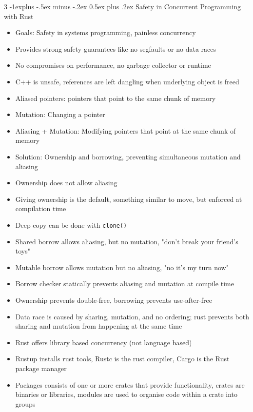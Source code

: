 \documentclass[10pt, landscape]{article}
\makeatletter
\renewcommand{\section}{\@startsection{section}{1}{0mm}%
                                {-1ex plus -.5ex minus -.2ex}%
                                {0.5ex plus .2ex}%
                                {\normalfont\large\bfseries}}
\renewcommand{\section}{\@startsection{section}{2}{0mm}%
                                {-1explus -.5ex minus -.2ex}%
                                {0.5ex plus .2ex}%
                                {\normalfont\normalsize\bfseries}}
\makeatother
\begin{document}
\begin{multicols*}{3}
\section{Safety in Concurrent Programming with Rust}
\begin{itemize}
    \item Goals: Safety in systems programming, painless concurrency
    \item Provides strong safety guarantees like no segfaults or no data races
    \item No compromises on performance, no garbage collector or runtime
    \item C++ is unsafe, references are left dangling when underlying object is freed
    \item Aliased pointers: pointers that point to the same chunk of memory
    \item Mutation: Changing a pointer
    \item Aliasing + Mutation: Modifying pointers that point at the same chunk of memory
    \item Solution: Ownership and borrowing, preventing simultaneous mutation and aliasing
    \item Ownership does not allow aliasing
    \item Giving ownership is the default, something similar to move, but enforced at compilation time
    \item Deep copy can be done with \texttt{clone()}
    \item Shared borrow allows aliasing, but no mutation, "don't break your friend's toys"
    \item Mutable borrow allows mutation but no aliasing, "no it's my turn now"
    \item Borrow checker statically prevents aliasing and mutation at compile time
    \item Ownership prevents double-free, borrowing prevents use-after-free
    \item Data race is caused by sharing, mutation, and no ordering; rust prevents both sharing and mutation from happening at the same time
    \item Rust offers library based concurrency (not language based)
    \item Rustup installs rust tools, Rustc is the rust compiler, Cargo is the Rust package manager
    \item Packages consists of one or more crates that provide functionality, crates are binaries or libraries, modules are used to organise code within a crate into groups

\end{itemize}
\end{multicols*}
\end{document}
